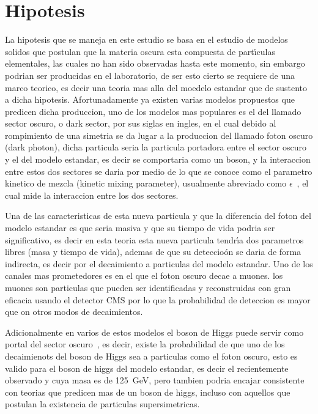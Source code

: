 \chapter{Hipotesis}

La hipotesis que se maneja en este estudio se basa en el estudio de modelos solidos que postulan que la materia oscura esta compuesta de part\'{\i}culas elementales, las cuales no han sido observadas hasta este momento, sin embargo podrian ser producidas en el laboratorio, de ser esto cierto se requiere de una marco teorico, es decir una teoria mas alla del moedelo estandar que de sustento a dicha hipotesis. Afortunadamente ya existen varias modelos propuestos que predicen dicha produccion, uno de los modelos mas populares es el del llamado sector oscuro, o dark sector, por sus siglas en ingles, en el cual debido al rompimiento de una simetria se da lugar a la produccion del llamado foton oscuro (dark photon), dicha particula seria la particula portadora entre el sector oscuro y el del modelo estandar, es decir se comportaria como un boson, y la interaccion entre estos dos sectores se daria por medio de lo que se conoce como el parametro kinetico de mezcla (kinetic mixing parameter), usualmente abreviado como $\epsilon$~\cite{LB}, el cual mide la interaccion entre los dos sectores.

Una de las caracteristicas de esta nueva particula y que la diferencia del foton del modelo estandar es que seria masiva y que su tiempo de vida podria ser significativo, es decir en esta teoria esta nueva particula tendr\'{\i}a dos parametros libres (masa y tiempo de vida), ademas de que su deteccio\'on se daria de forma indirecta, es decir por el decaimiento a particulas del modelo estandar.  Uno de los canales mas prometedores es en el que el foton oscuro decae a muones. los muones son particulas que pueden ser identificadas y reconstruidas con gran eficacia usando el detector CMS por lo que la probabilidad de deteccion es mayor que on otros modos de decaimientos.

Adicionalmente en varios de estos modelos el boson de Higgs puede servir como portal del sector oscuro~\cite{Arcadi:2019lka}, es decir, existe la probabilidad de que uno de los decaimienots del boson de Higgs sea a particulas como el foton oscuro, esto es valido para el boson de higgs del modelo estandar, es decir el recientemente observado y cuya masa es de 125~GeV, pero tambien podria encajar consistente con teorias que predicen mas de un boson de higgs, incluso con aquellos que postulan la existencia de particulas supersimetricas.




